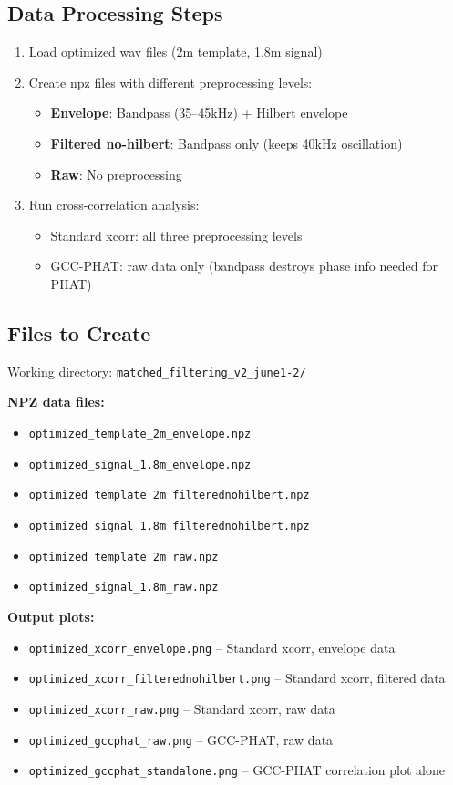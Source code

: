 \documentclass[11pt]{article}
\begin{document}
\subsection{Data Processing Steps}
\begin{enumerate}
    \item Load optimized wav files (2m template, 1.8m signal)
    \item Create npz files with different preprocessing levels:
    \begin{itemize}
        \item \textbf{Envelope}: Bandpass (35--45kHz) + Hilbert envelope
        \item \textbf{Filtered no-hilbert}: Bandpass only (keeps 40kHz oscillation)
        \item \textbf{Raw}: No preprocessing
    \end{itemize}
    \item Run cross-correlation analysis:
    \begin{itemize}
        \item Standard xcorr: all three preprocessing levels
        \item GCC-PHAT: raw data only (bandpass destroys phase info needed for PHAT)
    \end{itemize}
\end{enumerate}

\subsection{Files to Create}
Working directory: \texttt{matched\_filtering\_v2\_june1-2/}

\textbf{NPZ data files:}
\begin{itemize}
    \item \texttt{optimized\_template\_2m\_envelope.npz}
    \item \texttt{optimized\_signal\_1.8m\_envelope.npz}
    \item \texttt{optimized\_template\_2m\_filterednohilbert.npz}
    \item \texttt{optimized\_signal\_1.8m\_filterednohilbert.npz}
    \item \texttt{optimized\_template\_2m\_raw.npz}
    \item \texttt{optimized\_signal\_1.8m\_raw.npz}
\end{itemize}

\textbf{Output plots:}
\begin{itemize}
    \item \texttt{optimized\_xcorr\_envelope.png} -- Standard xcorr, envelope data
    \item \texttt{optimized\_xcorr\_filterednohilbert.png} -- Standard xcorr, filtered data
    \item \texttt{optimized\_xcorr\_raw.png} -- Standard xcorr, raw data
    \item \texttt{optimized\_gccphat\_raw.png} -- GCC-PHAT, raw data
    \item \texttt{optimized\_gccphat\_standalone.png} -- GCC-PHAT correlation plot alone
\end{itemize}
\end{document}
